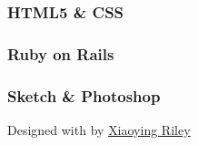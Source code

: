 \documentclass[english,]{article}
\begin{document}
\hypertarget{html5-css}{%
\subsubsection{HTML5 \& CSS}\label{html5-css}}

\hypertarget{ruby-on-rails}{%
\subsubsection{Ruby on Rails}\label{ruby-on-rails}}

\hypertarget{sketch-photoshop}{%
\subsubsection{Sketch \& Photoshop}\label{sketch-photoshop}}

{Designed with \emph{} by \href{http://themes.3rdwavemedia.com}{Xiaoying
Riley}}
\end{document}
